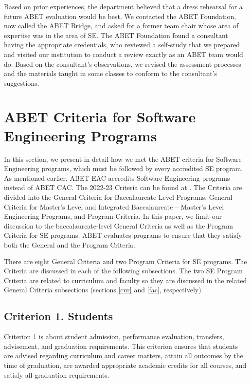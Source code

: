 \documentclass{article}
\begin{document}
Based on prior experiences, the department believed that a dress rehearsal for a future ABET evaluation would be best.  We contacted the ABET Foundation, now called the ABET Bridge, and asked for a former team chair whose area of expertise was in the area of SE.  The ABET Foundation found a consultant having the appropriate credentials, who reviewed a self-study that we prepared and visited our institution to conduct a review exactly as an ABET team would do.  Based on the consultant’s observations, we revised the assessment processes and the materials taught in some classes to conform to the consultant’s suggestions.  

\section{ABET Criteria for Software Engineering Programs}
In this section, we present in detail how we met the ABET criteria for Software Engineering programs, which must be followed by every accredited SE program.   As mentioned earlier, ABET EAC accredits Software Engineering programs instead of ABET CAC.  The 2022-23 Criteria can be found at \cite{abet22}. The Criteria are divided into the General Criteria for Baccalaureate Level Programs, General Criteria for Master’s Level and Integrated Baccalaureate – Master’s Level Engineering Programs, and Program Criteria.  In this paper, we limit our discussion to the baccalaureate-level General Criteria as well as the Program Criteria for SE programs.  ABET evaluates programs to ensure that they satisfy both the General and the Program Criteria.
        
There are eight General Criteria and two Program Criteria for SE programs.  The Criteria are discussed in each of the following subsections.  The two SE Program Criteria are related to curriculum and faculty so they are discussed in the related General Criteria subsections (sections \ref{cur} and \ref{fac}, respectively).

\subsection{Criterion 1. Students}
Criterion 1 is about student admission, performance evaluation, transfers, advisement, and graduation requirements. This criterion ensures that students are advised regarding curriculum and career matters, attain all outcomes by the time of graduation, are awarded appropriate academic credits for all courses, and satisfy all graduation requirements.
\end{document}
